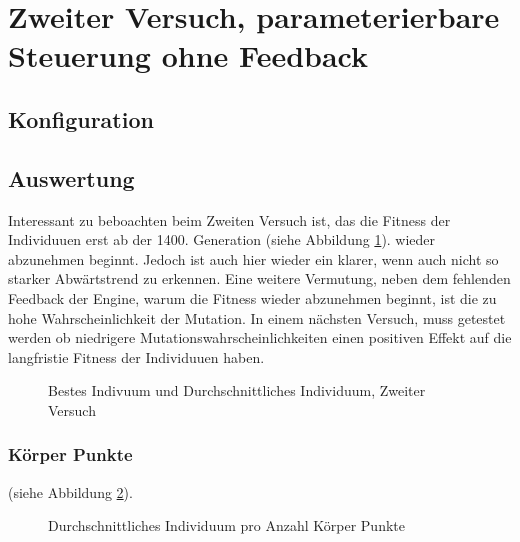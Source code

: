   \section{Zweiter Versuch, parameterierbare Steuerung ohne Feedback}

    \subsection{Konfiguration}
        

    \subsection{Auswertung}
      Interessant zu beboachten beim Zweiten Versuch ist, das die Fitness der Individuuen erst ab der 1400. Generation (siehe Abbildung \ref{fig:graphSecond}).
      wieder abzunehmen beginnt. Jedoch ist auch hier wieder ein klarer, wenn auch nicht so starker Abwärtstrend zu erkennen.
      Eine weitere Vermutung, neben dem fehlenden Feedback der Engine, warum die Fitness wieder abzunehmen beginnt,
      ist die zu hohe Wahrscheinlichkeit der Mutation. In einem nächsten Versuch, muss getestet werden ob niedrigere Mutationswahrscheinlichkeiten
      einen positiven Effekt auf die langfristie Fitness der Individuuen haben.
        \begin{figure}
          
          \caption{Bestes Indivuum und Durchschnittliches Individuum, Zweiter Versuch}
          \label{fig:graphSecond}
        \end{figure}

    \subsubsection{Körper Punkte}
      (siehe Abbildung \ref{fig:graphBpSecond}).
    \begin{figure}
      
      \caption{Durchschnittliches Individuum pro Anzahl Körper Punkte}
      \label{fig:graphBpSecond}
    \end{figure}
